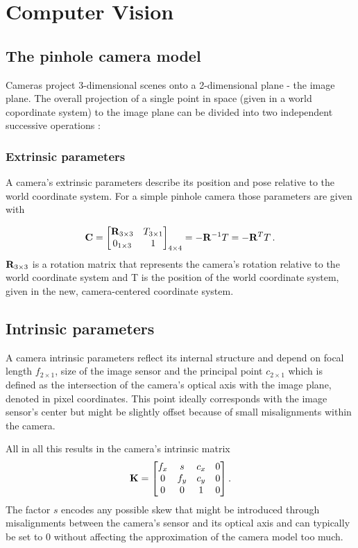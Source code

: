 \section { Computer Vision }
	\subsection { The pinhole camera model }
		Cameras project 3-dimensional scenes onto a 2-dimensional plane - the image plane.
		The overall projection of a single point in space (given in a world copordinate system) to the image plane can be divided into two independent successive operations \cite[S.~50]{Szeliski2010}:
		
		\subsubsection{Extrinsic parameters}
		A camera's extrinsic parameters describe its position and pose relative to the world coordinate system. For a simple pinhole camera those parameters are given with 
		
		\begin{equation}
		\mathbf{C} = \begin{bmatrix}
					\mathbf{R}_{3\times 3} & T_{3\times 1}\\
					0_{1\times 3} & 1
					\end{bmatrix}_{4\times 4} = -\mathbf{R}^{-1}T = -\mathbf{R}^TT \, . 
		\end{equation}
		$\mathbf{R}_{3\times 3}$ is a rotation matrix that represents the camera's rotation relative to the world coordinate system and T is the position of the world coordinate system, given in the new, camera-centered coordinate system. 

		\subsection{Intrinsic parameters}
		A camera intrinsic parameters reflect its internal structure and depend on focal length $f_{2\times 1}$, size of the image sensor and the principal point $c_{2\times1}$ which is defined as the intersection of the camera's optical axis with the image plane, denoted in pixel coordinates. This point ideally corresponds with the image sensor's center but might be slightly offset because of small misalignments within the camera.
		
		All in all this results in the camera's intrinsic matrix
		\begin{equation}
		\mathbf{K} =	\begin{bmatrix}
			f_x & s & c_x & 0 \\
			0 & f_y & c_y & 0 \\
			0 & 0 & 1 & 0
			\end{bmatrix}.
		\end{equation}
		The factor $s$ encodes any possible skew that might be introduced through misalignments between the camera's sensor and its optical axis and can typically be set to $0$ without affecting the approximation of the camera model too much.
		
